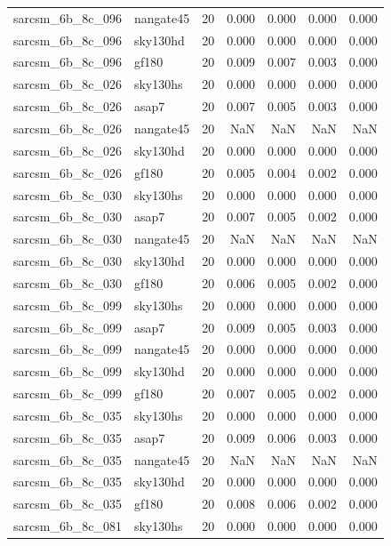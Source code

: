 \begin{tabular}{llrrrrr}
sarcsm\_6b\_8c\_096 & nangate45 & 20 & 0.000 & 0.000 & 0.000 & 0.000 \\
sarcsm\_6b\_8c\_096 & sky130hd & 20 & 0.000 & 0.000 & 0.000 & 0.000 \\
sarcsm\_6b\_8c\_096 & gf180 & 20 & 0.009 & 0.007 & 0.003 & 0.000 \\
sarcsm\_6b\_8c\_026 & sky130hs & 20 & 0.000 & 0.000 & 0.000 & 0.000 \\
sarcsm\_6b\_8c\_026 & asap7 & 20 & 0.007 & 0.005 & 0.003 & 0.000 \\
sarcsm\_6b\_8c\_026 & nangate45 & 20 & NaN & NaN & NaN & NaN \\
sarcsm\_6b\_8c\_026 & sky130hd & 20 & 0.000 & 0.000 & 0.000 & 0.000 \\
sarcsm\_6b\_8c\_026 & gf180 & 20 & 0.005 & 0.004 & 0.002 & 0.000 \\
sarcsm\_6b\_8c\_030 & sky130hs & 20 & 0.000 & 0.000 & 0.000 & 0.000 \\
sarcsm\_6b\_8c\_030 & asap7 & 20 & 0.007 & 0.005 & 0.002 & 0.000 \\
sarcsm\_6b\_8c\_030 & nangate45 & 20 & NaN & NaN & NaN & NaN \\
sarcsm\_6b\_8c\_030 & sky130hd & 20 & 0.000 & 0.000 & 0.000 & 0.000 \\
sarcsm\_6b\_8c\_030 & gf180 & 20 & 0.006 & 0.005 & 0.002 & 0.000 \\
sarcsm\_6b\_8c\_099 & sky130hs & 20 & 0.000 & 0.000 & 0.000 & 0.000 \\
sarcsm\_6b\_8c\_099 & asap7 & 20 & 0.009 & 0.005 & 0.003 & 0.000 \\
sarcsm\_6b\_8c\_099 & nangate45 & 20 & 0.000 & 0.000 & 0.000 & 0.000 \\
sarcsm\_6b\_8c\_099 & sky130hd & 20 & 0.000 & 0.000 & 0.000 & 0.000 \\
sarcsm\_6b\_8c\_099 & gf180 & 20 & 0.007 & 0.005 & 0.002 & 0.000 \\
sarcsm\_6b\_8c\_035 & sky130hs & 20 & 0.000 & 0.000 & 0.000 & 0.000 \\
sarcsm\_6b\_8c\_035 & asap7 & 20 & 0.009 & 0.006 & 0.003 & 0.000 \\
sarcsm\_6b\_8c\_035 & nangate45 & 20 & NaN & NaN & NaN & NaN \\
sarcsm\_6b\_8c\_035 & sky130hd & 20 & 0.000 & 0.000 & 0.000 & 0.000 \\
sarcsm\_6b\_8c\_035 & gf180 & 20 & 0.008 & 0.006 & 0.002 & 0.000 \\
sarcsm\_6b\_8c\_081 & sky130hs & 20 & 0.000 & 0.000 & 0.000 & 0.000 \\

\end{tabular}

